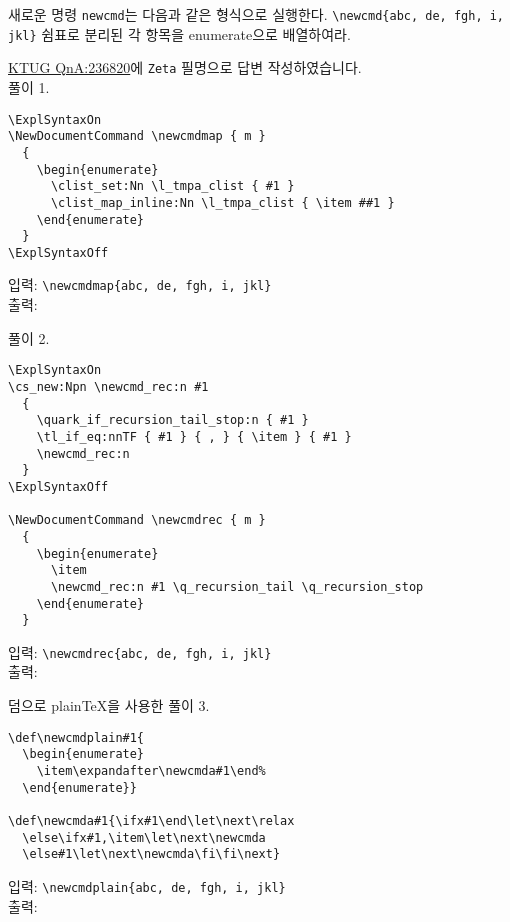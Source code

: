 \documentclass[a4paper,amsmath,itemph]{oblivoir}
\def\newcmdplain#1{
  \begin{enumerate}
    \item\expandafter\newcmda#1\end%
  \end{enumerate}}
\def\newcmda#1{\ifx#1\end\let\next\relax
  \else\ifx#1,\item\let\next\newcmda
  \else#1\let\next\newcmda\fi\fi\next}
\begin{document}
\begin{questiona}{4}
  새로운 명령 \verb|newcmd|는 다음과 같은 형식으로 실행한다.
  \verb|\newcmd{abc, de, fgh, i, jkl}|
  쉼표로 분리된 각 항목을 enumerate으로 배열하여라.

  \tcblower

  \href{http://www.ktug.org/xe/index.php?document_srl=236820&mid=KTUG_QnA_board}
  {KTUG QnA:236820}에 \texttt{Zeta} 필명으로 답변 작성하였습니다.\\

  풀이 1.
  \begin{verbatim}
\ExplSyntaxOn
\NewDocumentCommand \newcmdmap { m }
  {
    \begin{enumerate}
      \clist_set:Nn \l_tmpa_clist { #1 }
      \clist_map_inline:Nn \l_tmpa_clist { \item ##1 }
    \end{enumerate}
  }
\ExplSyntaxOff
  \end{verbatim}

  \begin{tcolorbox}{}
    입력: \verb|\newcmdmap{abc, de, fgh, i, jkl}|\\
    출력: 
  \end{tcolorbox}


  풀이 2.
  \begin{verbatim}
\ExplSyntaxOn
\cs_new:Npn \newcmd_rec:n #1
  {
    \quark_if_recursion_tail_stop:n { #1 }
    \tl_if_eq:nnTF { #1 } { , } { \item } { #1 }
    \newcmd_rec:n
  }
\ExplSyntaxOff

\NewDocumentCommand \newcmdrec { m }
  {
    \begin{enumerate}
      \item
      \newcmd_rec:n #1 \q_recursion_tail \q_recursion_stop
    \end{enumerate}
  }
  \end{verbatim}

  \begin{tcolorbox}{}
    입력: \verb|\newcmdrec{abc, de, fgh, i, jkl}|\\
    출력: 
  \end{tcolorbox}


  덤으로 plain\TeX{}을 사용한 풀이 3.
  \begin{verbatim}
\def\newcmdplain#1{
  \begin{enumerate}
    \item\expandafter\newcmda#1\end%
  \end{enumerate}}

\def\newcmda#1{\ifx#1\end\let\next\relax
  \else\ifx#1,\item\let\next\newcmda
  \else#1\let\next\newcmda\fi\fi\next}
  \end{verbatim}

  \begin{tcolorbox}{}
    입력: \verb|\newcmdplain{abc, de, fgh, i, jkl}|\\
    출력: \newcmdplain{abc, de, fgh, i, jkl}
  \end{tcolorbox}
\end{questiona}
\end{document}
